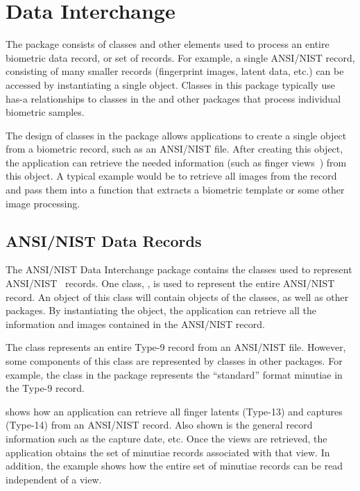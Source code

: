 %
%
\chapter{Data Interchange}
\label{chp-datainterchange}
The  package consists of classes and other elements
used to
process an entire biometric data record, or set of records. For example,
a single ANSI/NIST 
record, consisting of many smaller records (fingerprint images, latent data,
etc.) can be accessed by instantiating a single object. Classes in this
package typically use has-a relationships to classes in the 
and other packages that process individual biometric samples.

The design of classes in the  package allows
applications to
create a single object from a biometric record, such as an ANSI/NIST file.
After creating this object, the application can retrieve the needed information
(such as finger views~) from this object.
A typical example would be to retrieve all
images from the record and pass them into a function that extracts a biometric
template or some other image processing.

\section{ANSI/NIST Data Records}
\label{sec-ansinistdatarecords}

The ANSI/NIST Data Interchange package contains the classes used to represent
ANSI/NIST~\cite{std:an2k} records. One class, ,
is used to represent the entire ANSI/NIST record. An object of this class
will contain objects of the  classes, as well as other packages.
By instantiating the  object, the application can retrieve all
the information and images contained in the ANSI/NIST record.

The  class represents an entire Type-9 record
from an ANSI/NIST file. However, some components of this class are represented 
by classes in other packages. For example, the  class in
the 
package represents the ``standard'' format minutiae in the Type-9 record.

 shows how an application can retrieve all finger
latents (Type-13) and captures (Type-14) from an ANSI/NIST record. Also shown
is the general record information such as the capture date, etc.
Once the views are
retrieved, the application obtains the set of minutiae records associated with
that view. In addition, the example shows how the entire set of minutiae
records can be read independent of a view.

